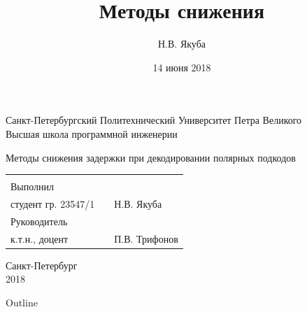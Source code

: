 

\title[Снижение задержки декодирования]{Методы снижения } %
\author{Н.В. Якуба} %
\date{14 июня 2018} %

\begingroup 
    \begin{frame}
      \centering
      Санкт-Петербургский Политехнический Университет Петра Великого \\ %
      Высшая школа программной инженерии\\
      \vspace{0.1\textheight}
      \begin{block}{}
        \centering
        \Large{Методы снижения задержки при декодировании полярных подкодов}
      \end{block}
      \vspace{0.05\textheight}
      \begin{tabular}{lll}
        &\hspace*{0.25\textwidth}&\\
        Выполнил\\ студент гр. 23547/1 && Н.В. Якуба\\
        Руководитель\\ к.т.н., доцент && П.В. Трифонов\\
      \end{tabular}
      \vfill
      Санкт-Петербург\\
      2018
    \end{frame}
\endgroup

\begingroup 
    \begin{frame}{Outline}
      \tableofcontents %
    \end{frame}
\endgroup

